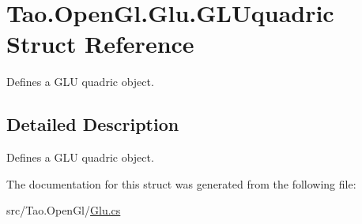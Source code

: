 \hypertarget{struct_tao_1_1_open_gl_1_1_glu_1_1_g_l_uquadric}{
\section{Tao.OpenGl.Glu.GLUquadric Struct Reference}
\label{struct_tao_1_1_open_gl_1_1_glu_1_1_g_l_uquadric}
}


Defines a GLU quadric object.  




\subsection{Detailed Description}
Defines a GLU quadric object. 

The documentation for this struct was generated from the following file:\begin{DoxyCompactItemize}
\item 
src/Tao.OpenGl/\hyperlink{_glu_8cs}{Glu.cs}\end{DoxyCompactItemize}
